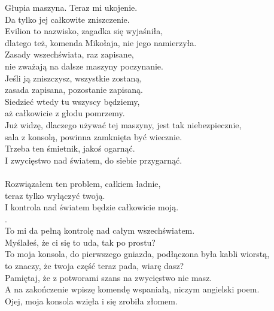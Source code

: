 \charszam{}
Głupia maszyna. Teraz mi ukojenie.\\
Da tylko jej całkowite zniszczenie.\\

\charfer{}
Evilion to nazwisko, zagadka się wyjaśniła,\\
dlatego też, komenda Mikołaja, nie jego namierzyła.\\
Zasady wszechświata, raz zapisane,\\
nie zważają na dalsze maszyny poczynanie.\\
Jeśli ją zniszczysz, wszystkie zostaną,\\
zasada zapisana, pozostanie zapisaną.\\
Siedzieć wtedy tu wszyscy będziemy,\\
aż całkowicie z głodu pomrzemy.\\

\charszam{}
Już widzę, dlaczego używać tej maszyny, jest tak niebezpiecznie,\\
sala z konsolą, powinna zamknięta być wiecznie.\\
Trzeba ten śmietnik, jakoś ogarnąć.\\
I zwycięstwo nad światem, do siebie przygarnąć.\\
\\
Rozwiązałem ten problem, całkiem ładnie,\\
teraz tylko wyłączyć twoją.\\
I kontrola nad światem będzie całkowicie moją.\\
.\\
To mi da pełną kontrolę nad całym wszechświatem.\\

\charfer{}
Myślałeś, że ci się to uda, tak po prostu?\\
To moja konsola, do pierwszego gniazda, podłączona była kabli wiorstą,\\
to znaczy, że twoja część teraz pada, wiarę dasz?\\
Pamiętaj, że z potworami szans na zwycięstwo nie masz.\\
A na zakończenie wpiszę komendę wspaniałą, niczym angielski poem.\\
Ojej, moja konsola wzięła i się zrobiła złomem.\\

\\


